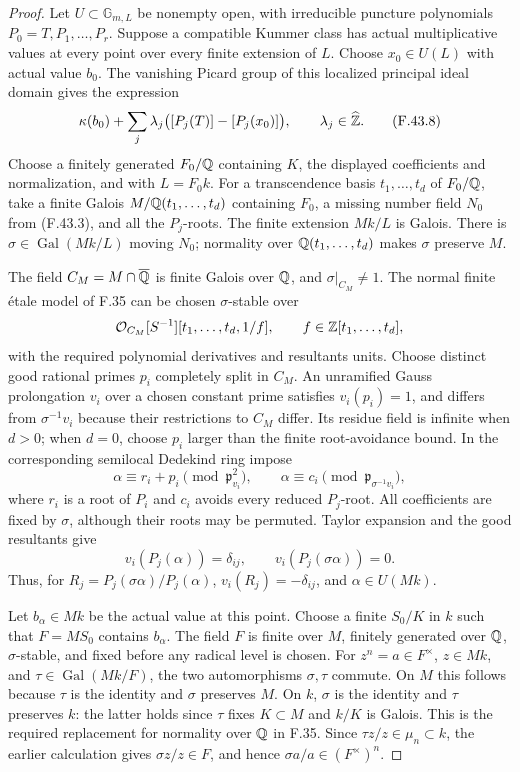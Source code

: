 \begin{proof}
Let $U\subset\mathbb G_{m,L}$ be nonempty open, with
irreducible puncture polynomials
$P_0=T,P_1,\ldots,P_r$. Suppose a compatible Kummer
class has actual multiplicative values at every point
over every finite extension of $L$. Choose
$x_0\in U(L)$ with actual value $b_0$. The vanishing
Picard group of this localized principal ideal
domain gives the expression
\[
 \kappa(b_0)+
 \sum_j\lambda_j\bigl([P_j(T)]-[P_j(x_0)]\bigr),
 \qquad\lambda_j\in\widehat{\mathbb Z}.                              \tag{F.43.8}
\]
Choose a finitely generated $F_0/\mathbb Q$ containing
$K$, the displayed coefficients and normalization,
and with $L=F_0k$. For a transcendence basis
$t_1,\ldots,t_d$ of $F_0/\mathbb Q$, take a finite Galois
$M/\mathbb Q(t_1,\ldots,t_d)$ containing $F_0$, a missing
number field $N_0$ from (F.43.3), and all the
$P_j$-roots. The finite extension $Mk/L$ is Galois.
There is $\sigma\in\operatorname{Gal}(Mk/L)$ moving
$N_0$; normality over $\mathbb Q(t_1,\ldots,t_d)$ makes
$\sigma$ preserve $M$.

The field $C_M=M\cap\overline{\mathbb Q}$ is finite Galois
over $\mathbb Q$, and $\sigma|_{C_M}\ne1$. The normal
finite étale model of F.35 can be chosen
$\sigma$-stable over
\[
 \mathcal O_{C_M}[S^{-1}]
       [t_1,\ldots,t_d,1/f],
       \qquad f\in\mathbb Z[t_1,\ldots,t_d],
\]
with the required polynomial derivatives and resultants
units. Choose distinct good rational primes $p_i$
completely split in $C_M$. An unramified Gauss
prolongation $v_i$ over a chosen constant prime
satisfies $v_i(p_i)=1$, and differs from
$\sigma^{-1}v_i$ because their restrictions to
$C_M$ differ. Its residue field is infinite when
$d>0$; when $d=0$, choose $p_i$ larger than the
finite root-avoidance bound.
In the corresponding semilocal Dedekind ring impose
\[
 \alpha\equiv r_i+p_i\pmod{\mathfrak p_{v_i}^2},
 \qquad
 \alpha\equiv c_i\pmod{\mathfrak p_{\sigma^{-1}v_i}},
\]
where $r_i$ is a root of $P_i$ and $c_i$ avoids
every reduced $P_j$-root. All coefficients are fixed
by $\sigma$, although their roots may be permuted.
Taylor expansion and the good resultants give
\[
 v_i(P_j(\alpha))=\delta_{ij},\qquad
 v_i(P_j(\sigma\alpha))=0.
\]
Thus, for $R_j=P_j(\sigma\alpha)/P_j(\alpha)$,
$v_i(R_j)=-\delta_{ij}$, and $\alpha\in U(Mk)$.

Let $b_\alpha\in Mk$ be the actual value at this
point. Choose a finite $S_0/K$ in $k$ such that
$F=MS_0$ contains $b_\alpha$. The field $F$ is
finite over $M$, finitely generated over $\mathbb Q$,
$\sigma$-stable, and fixed before any radical
level is chosen.
For $z^n=a\in F^\times$, $z\in Mk$, and
$\tau\in\operatorname{Gal}(Mk/F)$, the two
automorphisms $\sigma,\tau$ commute. On $M$ this
follows because $\tau$ is the identity and
$\sigma$ preserves $M$. On $k$, $\sigma$ is the
identity and $\tau$ preserves $k$: the latter
holds since $\tau$ fixes $K\subset M$ and $k/K$
is Galois. This is the required replacement for
normality over $\mathbb Q$ in F.35.
Since $\tau z/z\in\mu_n\subset k$, the earlier
calculation gives $\sigma z/z\in F$, and hence
$\sigma a/a\in(F^\times)^n$.


\end{proof}
